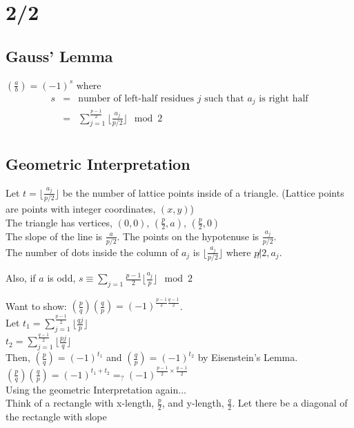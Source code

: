 \section*{2/2}
  \subsection*{Gauss' Lemma}
  $(\frac{a}{b}) = (-1)^s$ where
  \begin{eqnarray*}
    s & = & \text{number of left-half residues $j$ such that $a_j$ is
      right half}\\
      & = & \sum_{j = 1}^{\frac{p-1}{2}} \lfloor \frac{a_j}{p/2} \rfloor \mod 
        2\\
  \end{eqnarray*}
  \subsection*{Geometric Interpretation}
    Let $t = \lfloor \frac{a_j}{p/2} \rfloor $ be the number of lattice
    points inside of a triangle. (Lattice points are points with integer
    coordinates, $(x,y)$)\\
    The triangle has vertices, $(0,0)$, $(\frac{p}{2}, a)$, $(\frac{p}{2}, 
    0)$\\
    The slope of the line is $\frac{a}{p/2}$. The points on the hypotenuse is
    $\frac{a_j}{p/2}$.\\
    The number of dots inside the column of $a_j$ is $\lfloor \frac{a_j}{p/2}
    \rfloor$ where $p \not| 2, a_j$.
  \begin{lemma}
    Also, if $a$ is odd, $s \equiv \sum_{j = 1}{\frac{p-1}{2}}
      \lfloor \frac{a_j}{p} \rfloor \mod 2$
  \end{lemma}
  Want to show: $(\frac{p}{q})(\frac{q}{p}) = (-1)^{\frac{p-1}{2}
  \frac{q-1}{2}}$.\\
  Let $t_1 = \sum_{j = 1}^{\frac{p-1}{2}} \lfloor \frac{qj}{p} \rfloor$\\
    $t_2 = \sum_{j = 1}^{\frac{q-1}{2}} \lfloor \frac{pj}{q} \rfloor$\\
  Then, $(\frac{p}{q}) = (-1)^{t_1}$ and $(\frac{q}{p}) = (-1)^{t_2}$
  by Eisenstein's Lemma.\\
  $(\frac{p}{q})(\frac{q}{p}) = (-1)^{t_1 + t_2} =_? (-1)^{\frac{p-1}{2} \times
  \frac{q-1}{2}}$\\
  Using the geometric Interpretation again...\\
  Think of a rectangle with x-length, $\frac{p}{2}$, and y-length, 
  $\frac{q}{2}$. Let there be a diagonal of the rectangle with slope
